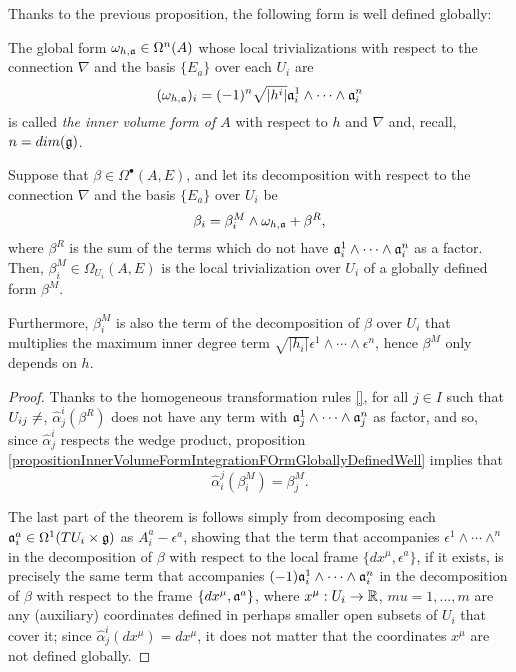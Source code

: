 Thanks to the previous proposition, the following form is well defined globally:
\begin{definition}
The global form $\omega_{h, \mathfrak{a}} \in \Omega^n(A)$ whose local trivializations with respect to the connection $\nabla$ and the basis $\{E_a\}$ over each $U_i$ are
\begin{equation*}
    (\omega_{h, \mathfrak{a}})_i = (-1)^n \sqrt{|h^i|} \mathfrak{a}_i^1 \wedge \cdots \wedge \mathfrak{a}_i^n
\end{equation*}
is called \emph{the inner volume form of $A$} with respect to $h$ and $\nabla$ and, recall, $n = dim(\mathfrak{g})$.
\end{definition}

\begin{theorem}\label{theoremIntegratedFormFactorInnerVolumeFOrmWellGloballyDefined}
Suppose that $\beta \in \Omega^\bullet(A, E)$, and let its decomposition with respect to the connection $\nabla$ and the basis $\{E_a\}$ over $U_i$ be
\begin{equation*}
    \beta_i = \beta^{M}_i \wedge \omega_{h, \alg a}%
    + \beta^R,
\end{equation*}
where $\beta^R$ is the sum of the terms which do not have $\mathfrak{a}_i^1 \wedge \cdots \wedge \mathfrak{a}_i^n$ as a factor. Then, $\beta_i^M \in \Omega_{U_i}(A, E)$ is the local trivialization over $U_i$ of a globally defined form $\beta^M$.

Furthermore, $\beta_i^M$ is also the term of the decomposition of $\beta$ over $U_i$ that multiplies the maximum inner degree term $\sqrt{|h_i|} \epsilon^1 \wedge \cdots \wedge \epsilon^n$, hence $\beta^M$ only depends on $h$.
\end{theorem}

\begin{proof}
Thanks to the homogeneous transformation rules \ref{}, for all $j \in I$ such that $U_{ij} \neq \empty$, $\hat \alpha^i_j(\beta^R)$ does not have any term with $\mathfrak{a}_j^1 \wedge \cdots \wedge \mathfrak{a}_j^n$ as factor, and so, since $\hat \alpha^i_j$ respects the wedge product, proposition \ref{propositionInnerVolumeFormIntegrationFOrmGloballyDefinedWell} implies that
\begin{equation}
    \hat \alpha^j_i(\beta^{M}_i) = \beta^{M}_j.
\end{equation}

The last part of the theorem is follows simply from decomposing each $\mathfrak{a}_i^a \in \Omega^1(TU_i \times \mathfrak{g})$ as $A_i^a - \epsilon^a$, showing that the term that accompanies $\epsilon^1 \wedge \cdots \wedge^n$ in the decomposition of $\beta$ with respect to the local frame $\{dx^\mu, \epsilon^a\}$, if it exists, is precisely the same term that accompanies $(-1)\mathfrak{a}_i^1 \wedge \cdots \wedge \mathfrak{a}_i^n$ in the decomposition of $\beta$ with respect to the frame $\{dx^\mu, \mathfrak{a}^a\}$, where $x^\mu: U_i\to \mathbb{R}$, $mu = 1, \dots , m$ are any (auxiliary) coordinates defined in perhaps smaller open subsets of $U_i$ that cover it; since $\hat \alpha^i_j(dx^\mu) = dx^\mu$, it does not matter that the coordinates $x^\mu$ are not defined globally.
\end{proof}


